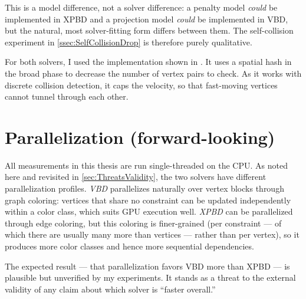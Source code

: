 This is a model difference, not a solver difference: a penalty model \emph{could}
be implemented in XPBD and a projection model \emph{could} be implemented in VBD,
but the natural, most solver-fitting form differs between them. The self-collision
experiment in \autoref{ssec:SelfCollisionDrop} is therefore purely qualitative.

For both solvers, I used the implementation shown in \cite{tenMinutePhysics}.
It uses a spatial hash in the broad phase to decrease the number of vertex pairs to check.
As it works with discrete collision detection, it caps the velocity, so that
fast-moving vertices cannot tunnel through each other.

\section{Parallelization (forward-looking)}
\label{sec:Parallelization}
All measurements in this thesis are run single-threaded on the CPU. As noted here
and revisited in \autoref{sec:ThreatsValidity}, the two solvers have different
parallelization profiles. \emph{VBD} parallelizes naturally over vertex blocks
through graph coloring: vertices that share no constraint can be updated
independently within a color class, which suits GPU execution well. \emph{XPBD}
can be parallelized through edge coloring, but this coloring is finer-grained
(per constraint --- of which there are usually many more than vertices --- rather
than per vertex), so it produces more color classes and hence more sequential
dependencies.

The expected result --- that parallelization favors VBD more than XPBD --- is
plausible but unverified by my experiments. It stands as a threat to the external
validity of any claim about which solver is ``faster overall.''
